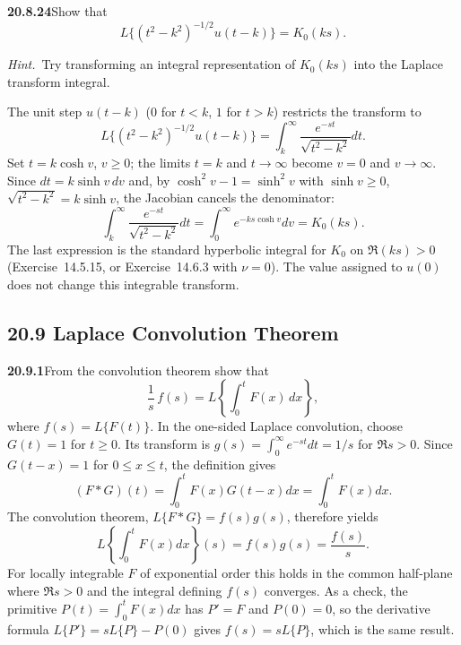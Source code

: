 \par\bigskip
\noindent\textbf{20.8.24}\quad Show that
\[
L\big\{(t^{2}-k^{2})^{-1/2}u(t-k)\big\}=K_{0}(ks).
\]
\par{}
\par\emph{Hint.}~Try transforming an integral representation of
$K_{0}(ks)$ into the Laplace transform integral.
\par{}
\solution
{}
The unit step $u(t-k)$ ($0$ for $t<k$, $1$ for $t>k$)
restricts the transform to
\[
L\{(t^2-k^2)^{-1/2}u(t-k)\}
=\int_k^\infty\frac{e^{-st}}{\sqrt{t^2-k^2}}dt.
\]
Set $t=k\cosh v$, $v\ge0$; the limits $t=k$ and $t\to\infty$
become $v=0$ and $v\to\infty$. Since
$dt=k\sinh v\,dv$ and, by $\cosh^2v-1=\sinh^2v$ with
$\sinh v\ge0$,
$\sqrt{t^2-k^2}=k\sinh v$, the Jacobian cancels the denominator:
\[
\int_k^\infty\frac{e^{-st}}{\sqrt{t^2-k^2}}dt
=\int_0^\infty e^{-ks\cosh v}dv=\boxed{K_0(ks)}.
\]
The last expression is the standard hyperbolic integral for
$K_0$ on $\Re(ks)>0$ (Exercise~14.5.15, or Exercise~14.6.3 with
$\nu=0$). The value assigned to $u(0)$ does not
change this integrable transform.

\subsection*{20.9 Laplace Convolution Theorem}

\par\bigskip
\noindent\textbf{20.9.1}\quad From the convolution theorem show
that
\[
\frac{1}{s}\,f(s)=L\left\{\int_{0}^{t}F(x)\,dx\right\},
\]
where $f(s)=L\{F(t)\}$.
\solution
In the one-sided Laplace convolution, choose $G(t)=1$
for $t\ge0$. Its transform is
$g(s)=\int_0^\infty e^{-st}dt=1/s$ for $\Re s>0$. Since
$G(t-x)=1$ for $0\le x\le t$, the definition gives
\[
(F*G)(t)=\int_0^tF(x)G(t-x)dx=\int_0^tF(x)dx.
\]
The convolution theorem, $L\{F*G\}=f(s)g(s)$, therefore yields
\[
\boxed{L\left\{\int_0^tF(x)dx\right\}(s)
=f(s)g(s)=\frac{f(s)}s}.
\]
For locally integrable $F$ of exponential order this
holds in the common half-plane where $\Re s>0$ and the
integral defining $f(s)$ converges. As a check, the primitive
$P(t)=\int_0^tF(x)dx$ has $P'=F$ and $P(0)=0$, so the
derivative formula $L\{P'\}=sL\{P\}-P(0)$ gives
$f(s)=sL\{P\}$, which is the same result.

